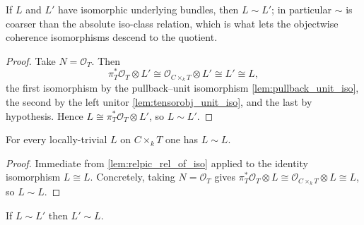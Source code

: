 \begin{lemma}
  \label{lem:relpic_rel_of_iso}
  If \(L\) and \(L'\) have isomorphic underlying bundles, then \(L \sim L'\); in
  particular \(\sim\) is coarser than the absolute iso-class relation, which is
  what lets the objectwise coherence isomorphisms descend to the quotient.
\end{lemma}

\begin{proof}
  \leanok
  Take \(N = \mathcal{O}_T\). Then
  \[
    \pi_T^* \mathcal{O}_T \otimes L'
      \cong \mathcal{O}_{C \times_k T} \otimes L'
      \cong L' \cong L ,
  \]
  the first isomorphism by the pullback--unit isomorphism
  \cref{lem:pullback_unit_iso}, the second by the left unitor
  \cref{lem:tensorobj_unit_iso}, and the last by hypothesis. Hence
  \(L \cong \pi_T^* \mathcal{O}_T \otimes L'\), so \(L \sim L'\).
\end{proof}

\begin{lemma}\leanok
  \label{lem:relpic_setoid_refl}
  For every locally-trivial \(L\) on \(C \times_k T\) one has \(L \sim L\).
\end{lemma}

\begin{proof}
  Immediate from \cref{lem:relpic_rel_of_iso} applied to the identity
  isomorphism \(L \cong L\). Concretely, taking \(N = \mathcal{O}_T\) gives
  \(\pi_T^* \mathcal{O}_T \otimes L \cong \mathcal{O}_{C \times_k T} \otimes L
  \cong L\), so \(L \sim L\).
\leanok
\end{proof}

\begin{lemma}\leanok
  \label{lem:relpic_setoid_symm}
  If \(L \sim L'\) then \(L' \sim L\).
\end{lemma}

